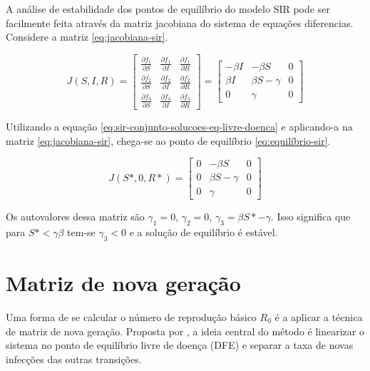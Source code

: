A análise de estabilidade dos pontos de equilíbrio do modelo SIR pode ser facilmente 
feita através da matriz jacobiana do sistema de equações diferencias. 
Considere a matriz \ref{eq:jacobiana-sir}.

\begin{equation}\label{eq:jacobiana-sir}
J(S,I,R) = 
\begin{bmatrix}
\frac{\partial f_1}{\partial S} & \frac{\partial f_1}{\partial I} & \frac{\partial f_1}{\partial R} \\[0.5em]
\frac{\partial f_2}{\partial S} & \frac{\partial f_2}{\partial I} & \frac{\partial f_2}{\partial R} \\[0.5em]
\frac{\partial f_3}{\partial S} & \frac{\partial f_3}{\partial I} & \frac{\partial f_3}{\partial R}
\end{bmatrix}
=
\begin{bmatrix}
-\beta I & -\beta S & 0 \\
\beta I & \beta S - \gamma & 0 \\
0 & \gamma & 0
\end{bmatrix}
\end{equation}

Utilizando a equação \ref{eq:sir-conjunto-solucoes-eq-livre-doenca} e aplicando-a
na matriz \ref{eq:jacobiana-sir}, chega-se ao ponto de equilíbrio 
\ref{eq:equilíbrio-sir}.

\begin{equation}\label{eq:equilíbrio-sir}
J(S*,0,R*)
=
\begin{bmatrix}
0 & -\beta S & 0 \\
0 & \beta S - \gamma & 0 \\
0 & \gamma & 0
\end{bmatrix}
\end{equation}

Os autovalores dessa matriz são $\gamma_1=0$, $\gamma_2=0$, $\gamma_3=\beta S* - \gamma$. 
Isso significa que para $S* < \gamma \beta$ tem-se $\gamma_3 < 0$ e a solução 
de equilíbrio é estável.

\section{Matriz de nova geração}

Uma forma de se calcular o número de reprodução básico $R_0$ é a aplicar a técnica
de matriz de nova geração. Proposta por \cite{diekmann:1990-matriz-de-nova-geracao},
a ideia central do método é linearizar o sistema no ponto de equilíbrio livre de
doença (DFE) e separar a taxa de novas infecções das outras transições. 

